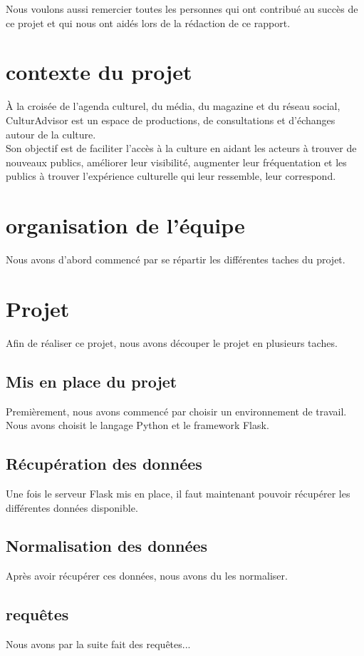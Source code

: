 \documentclass{article} %
\begin{document}
Nous voulons aussi remercier toutes les personnes qui ont contribué au succès de ce projet et qui nous ont aidés lors de la rédaction de ce rapport.
\newpage
\tableofcontents
\newpage %
\section{contexte du projet}
À la croisée de l’agenda culturel, du média, du magazine et du réseau social, CulturAdvisor est un espace de productions, de consultations et d’échanges autour de la culture. \\
Son objectif est de faciliter l’accès à la culture en aidant les acteurs à trouver de nouveaux publics, améliorer leur visibilité, augmenter leur fréquentation et les publics à trouver l’expérience culturelle qui leur ressemble, leur correspond.


\section{organisation de l'équipe}
Nous avons d'abord commencé par se répartir les différentes taches du projet.

\section{Projet}
Afin de réaliser ce projet, nous avons découper le projet en plusieurs taches.

\subsection{Mis en place du projet}
Premièrement, nous avons commencé par choisir un environnement de travail. \\
Nous avons choisit le langage Python et le framework Flask.

\subsection{Récupération des données}
Une fois le serveur Flask mis en place, il faut maintenant pouvoir récupérer les différentes données disponible.
\subsection{Normalisation des données}
Après avoir récupérer ces données, nous avons du les normaliser.

\subsection{requêtes}
Nous avons par la suite fait des requêtes...
\end{document}
